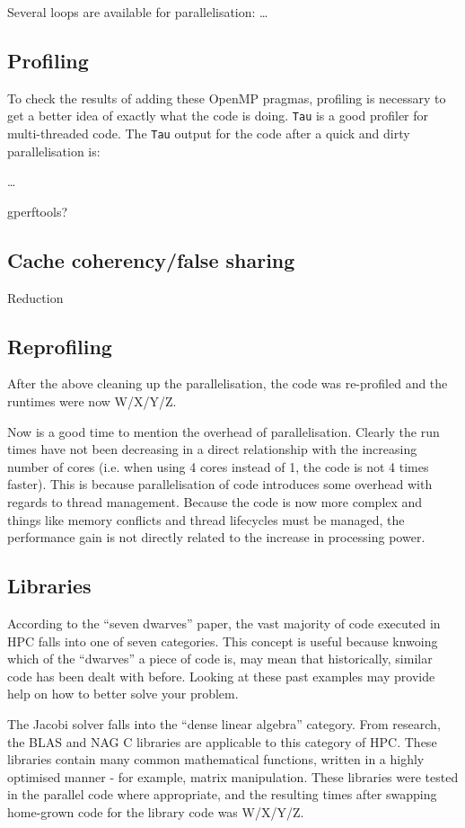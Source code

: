 \documentclass{article}
\begin{document}
Several loops are available for parallelisation: \ldots

\subsection{Profiling}
To check the results of adding these OpenMP pragmas, profiling is
necessary to get a better idea of exactly what the code is
doing. \texttt{Tau} is a good profiler for multi-threaded code. The
\texttt{Tau} output for the code after a quick and dirty
parallelisation is:

\ldots

gperftools?

\subsection{Cache coherency/false sharing}
Reduction

\subsection{Reprofiling}
After the above cleaning up the parallelisation, the code was
re-profiled and the runtimes were now W/X/Y/Z.

Now is a good time to mention the overhead of parallelisation. Clearly
the run times have not been decreasing in a direct relationship with
the increasing number of cores (i.e. when using 4 cores instead of 1,
the code is not 4 times faster). This is because parallelisation of
code introduces some overhead with regards to thread
management. Because the code is now more complex and things like
memory conflicts and thread lifecycles must be managed, the
performance gain is not directly related to the increase in processing power.

\subsection{Libraries}
According to the ``seven dwarves'' paper, the vast
majority of code executed in HPC falls into one of seven
categories. This concept is useful because knwoing which of the
``dwarves'' a piece of code is, may mean that historically, similar
code has been dealt with before. Looking at these past examples may
provide help on how to better solve your problem.

The Jacobi solver falls into the ``dense linear algebra''
category. From research, the BLAS and NAG C libraries are applicable
to this category of HPC. These libraries contain many common mathematical
functions, written in a highly optimised manner - for example, matrix
manipulation. These libraries were tested in the parallel code where
appropriate, and the resulting times after swapping home-grown code
for the library code was W/X/Y/Z.
\end{document}
